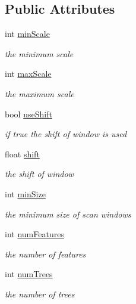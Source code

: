 \subsection*{Public Attributes}
\begin{DoxyCompactItemize}
\item 
int \hyperlink{classtld_1_1DetectorCascade_a24aed44c48fe4616465a556bd6642d5e}{min\-Scale}
\begin{DoxyCompactList}\small\item\em the minimum scale \end{DoxyCompactList}\item 
int \hyperlink{classtld_1_1DetectorCascade_aac2cd4b31c290d1eeba69591cbb65ce4}{max\-Scale}
\begin{DoxyCompactList}\small\item\em the maximum scale \end{DoxyCompactList}\item 
bool \hyperlink{classtld_1_1DetectorCascade_a2549b35ac099860f20a13ef830081bbb}{use\-Shift}
\begin{DoxyCompactList}\small\item\em if true the shift of window is used \end{DoxyCompactList}\item 
float \hyperlink{classtld_1_1DetectorCascade_a18b12b643d662cc9c8850c963079233c}{shift}
\begin{DoxyCompactList}\small\item\em the shift of window \end{DoxyCompactList}\item 
int \hyperlink{classtld_1_1DetectorCascade_add27e1ff17e2fda214d08f74d0c164e9}{min\-Size}
\begin{DoxyCompactList}\small\item\em the minimum size of scan windows \end{DoxyCompactList}\item 
int \hyperlink{classtld_1_1DetectorCascade_a63af0a8c55ac292b25f2f72b6e734280}{num\-Features}
\begin{DoxyCompactList}\small\item\em the number of features \end{DoxyCompactList}\item 
int \hyperlink{classtld_1_1DetectorCascade_a2d41ea56f304562878151ae09c34aa8f}{num\-Trees}
\begin{DoxyCompactList}\small\item\em the number of trees \end{DoxyCompactList}\item 

\end{DoxyCompactItemize}
